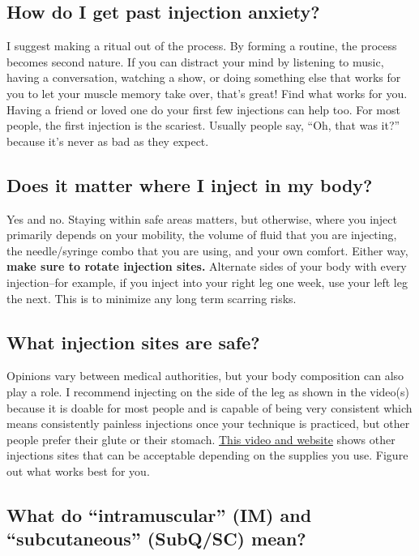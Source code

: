\documentclass{article}
\begin{document}
\subsection{How do I get past injection anxiety?}

I suggest making a ritual out of the process. By forming a routine, the process becomes second nature. If you can distract your mind by listening to music, having a conversation, watching a show, or doing something else that works for you to let your muscle memory take over, that’s great! Find what works for you. Having a friend or loved one do your first few injections can help too. For most people, the first injection is the scariest. Usually people say, “Oh, that was it?” because it’s never as bad as they expect.

\subsection{Does it matter where I inject in my body?}

Yes and no. Staying within safe areas matters, but otherwise, where you inject primarily depends on your mobility, the volume of fluid that you are injecting, the needle/syringe combo that you are using, and your own comfort. Either way, \textbf{make sure to rotate injection sites.} Alternate sides of your body with every injection–for example, if you inject into your right leg one week, use your left leg the next. This is to minimize any long term scarring risks.

\subsection{What injection sites are safe?}

Opinions vary between medical authorities, but your body composition can also play a role. I recommend injecting on the side of the leg as shown in the video(s) because it is doable for most people and is capable of being very consistent which means consistently painless injections once your technique is practiced, but other people prefer their glute or their stomach. \href{https://vertisis.com/articles/how-to-self-administer-a-subcutaneous-injection}{This video and website} shows other injections sites that can be acceptable depending on the supplies you use. Figure out what works best for you.

\subsection{What do “intramuscular” (IM) and “subcutaneous” (SubQ/SC) mean?}
\end{document}
